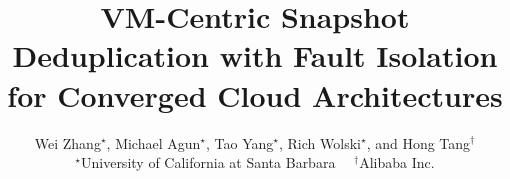 \documentclass[letterpaper,twocolumn,10pt]{article}
\begin{document}
\title{
VM-Centric  Snapshot Deduplication  with Fault Isolation 
for Converged Cloud Architectures} 
\author{
  Wei Zhang$^{\star}$, Michael Agun$^\star$, Tao Yang$^\star$, Rich Wolski$^{\star}$, and  Hong Tang$^\dagger$\\
  {\normalsize$^\star$University of California at Santa Barbara} \ \ {\normalsize$^\dagger$Alibaba Inc.} \\
}

\maketitle











\begin{small}


\end{small}
\end{document}
